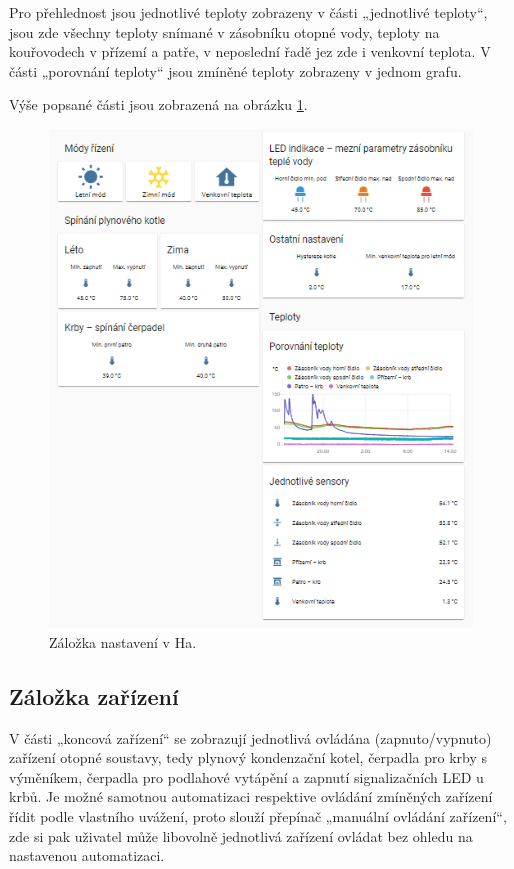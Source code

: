 Pro přehlednost jsou jednotlivé teploty zobrazeny v části „jednotlivé teploty“, jsou zde všechny teploty snímané v zásobníku otopné vody, teploty na kouřovodech v přízemí a patře, v neposlední řadě jez zde i venkovní teplota. V části „porovnání teploty“ jsou zmíněné teploty zobrazeny v jednom grafu.

Výše popsané části jsou zobrazená na obrázku \ref{fig:ha-nastaveni}.

\begin{figure}[H]
    \centering
    \includegraphics[width=\textwidth]{images/software-ha/ha-nastaveni.png}
    \caption{Záložka nastavení v Ha.}
    \label{fig:ha-nastaveni}
\end{figure}

\subsection{Záložka zařízení}
V části „koncová zařízení“ se zobrazují jednotlivá ovládána (zapnuto/vypnuto) zařízení otopné soustavy, tedy plynový kondenzační kotel, čerpadla pro krby s výměníkem, čerpadla pro podlahové vytápění a zapnutí signalizačních LED u krbů. Je možné samotnou automatizaci respektive ovládání zmíněných zařízení řídit podle vlastního uvážení, proto slouží přepínač „manuální ovládání zařízení“, zde si pak uživatel může libovolně jednotlivá zařízení ovládat bez ohledu na nastavenou automatizaci.

